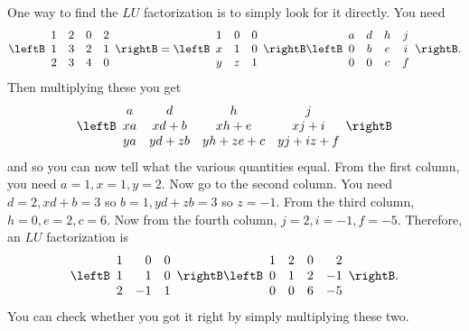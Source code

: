 One way to find the $LU$ factorization%
 is to simply look for it directly.
You need 
\begin{equation*}
\leftB 
\begin{array}{cccc}
1 & 2 & 0 & 2 \\ 
1 & 3 & 2 & 1 \\ 
2 & 3 & 4 & 0%
\end{array}
\rightB =\leftB 
\begin{array}{ccc}
1 & 0 & 0 \\ 
x & 1 & 0 \\ 
y & z & 1%
\end{array}
\rightB \leftB 
\begin{array}{cccc}
a & d & h & j \\ 
0 & b & e & i \\ 
0 & 0 & c & f%
\end{array}
\rightB .
\end{equation*}
Then multiplying these you get 
\begin{equation*}
\allowbreak \leftB 
\begin{array}{cccc}
a & d & h & j \\ 
xa & xd+b & xh+e & xj+i \\ 
ya & yd+zb & yh+ze+c & yj+iz+f%
\end{array}
\rightB
\end{equation*}
and so you can now tell what the various quantities equal. From the first
column, you need $a=1,x=1,y=2.$ Now go to the second column. You need $
d=2,xd+b=3$ so $b=1,yd+zb=3$ so $z=-1.$ From the third column, $h=0,e=2,c=6.$
Now from the fourth column, $j=2,i=-1,f=-5.$ Therefore, an $LU$
factorization is 
\begin{equation*}
\leftB 
\begin{array}{rrr}
1 & 0 & 0 \\ 
1 & 1 & 0 \\ 
2 & -1 & 1
\end{array}
\rightB \leftB 
\begin{array}{rrrr}
1 & 2 & 0 & 2 \\ 
0 & 1 & 2 & -1 \\ 
0 & 0 & 6 & -5
\end{array}
\rightB .
\end{equation*}
You can check whether you got it right by simply multiplying these two.
